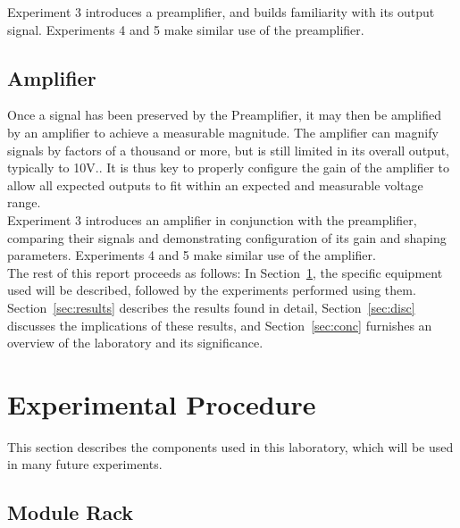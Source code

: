 \documentclass[12pt]{article}
\begin{document}
Experiment 3 introduces a preamplifier, and builds familiarity with its output signal.
Experiments 4 and 5 make similar use of the preamplifier.\\


\subsection{Amplifier}
Once a signal has been preserved by the Preamplifier, it may then be amplified by an amplifier to achieve a measurable magnitude.
The amplifier can magnify signals by factors of a thousand or more, but is still limited in its overall output, typically to 10V.\cite{tsoulfanidis_measurement_2015}.
It is thus key to properly configure the gain of the amplifier to allow all expected outputs to fit within an expected and measurable voltage range.\\

Experiment 3 introduces an amplifier in conjunction with the preamplifier, comparing their signals and demonstrating configuration of its gain and shaping parameters. Experiments 4 and 5 make similar use of the amplifier.\\


The rest of this report proceeds as follows: In Section~\ref{sec:methods}, the specific equipment used will be described, followed by the experiments performed using them.
Section~\ref{sec:results} describes the results found in detail, Section~\ref{sec:disc} discusses the implications of these results, and Section~\ref{sec:conc} furnishes an overview of the laboratory and its significance.


\section{Experimental Procedure}\label{sec:methods}
This section describes the components used in this laboratory, which will be used in many future experiments.
\\

\subsection{Module Rack}
\end{document}

